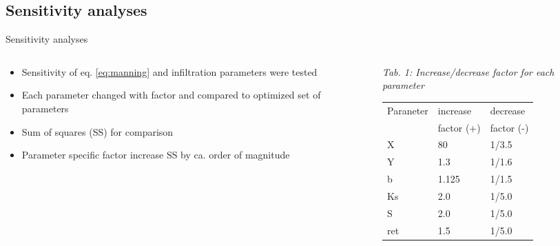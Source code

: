 
\subsection{Sensitivity analyses}
\begin{block}{Sensitivity analyses}
\justifying
\begin{columns}
        \begin{column}{0.25\textwidth}
            \begin{itemize}
                \item Sensitivity of eq. \ref{eq:manning} and infiltration parameters were tested
                \item Each parameter changed with factor and compared to optimized set of parameters 
                \item Sum of squares (SS) for comparison
                \item Parameter specific factor increase SS by ca. order of magnitude
            \end{itemize}
        \end{column}
    \begin{column}{0.25\textwidth}
            \justifying
            {\it Tab. 1: Increase/decrease factor for each parameter}
        \begin{table}[]
            \small
            \begin{tabular}{lll}
                \hline
                \hline
                Paraneter & increase   & decrease \\
                          & factor (+) & factor (-) \\
                \hline
                X         & 80                  & 1/3.5               \\
                Y         & 1.3                 & 1/1.6               \\
                b         & 1.125               & 1/1.5               \\
                Ks        & 2.0                 & 1/5.0               \\
                S         & 2.0                 & 1/5.0               \\
                ret       & 1.5                 & 1/5.0              \\
                \hline
                \hline

\end{tabular}
\end{table}
\end{column}
\end{columns}
\end{block}
